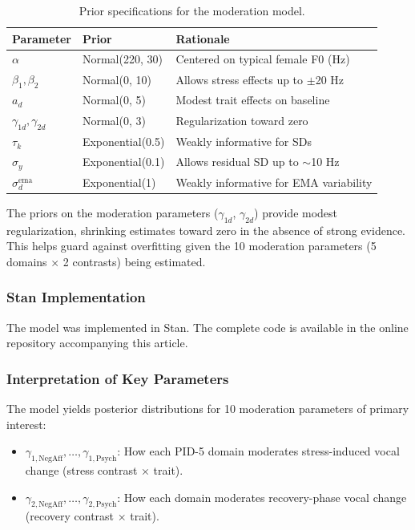 \documentclass[
  english,
  man,floatsintext]{apa6}
\providecommand{\tightlist}{%
  \setlength{\itemsep}{0pt}\setlength{\parskip}{0pt}}
\begin{document}
\begin{table}

\caption{\label{tab:table-s9-priors-moderation}Prior specifications for the moderation model.}
\centering
\begin{tabular}[t]{lll}
\toprule
Parameter & Prior & Rationale\\
\midrule
$\alpha$ & Normal(220, 30) & Centered on typical female F0 (Hz)\\
$\beta_1, \beta_2$ & Normal(0, 10) & Allows stress effects up to $\pm$20 Hz\\
$a_d$ & Normal(0, 5) & Modest trait effects on baseline\\
$\gamma_{1d}, \gamma_{2d}$ & Normal(0, 3) & Regularization toward zero\\
$\tau_k$ & Exponential(0.5) & Weakly informative for SDs\\
\addlinespace
$\sigma_y$ & Exponential(0.1) & Allows residual SD up to $\sim$10 Hz\\
$\sigma_d^{\text{ema}}$ & Exponential(1) & Weakly informative for EMA variability\\
\bottomrule
\end{tabular}
\end{table}

The priors on the moderation parameters (\(\gamma_{1d}\), \(\gamma_{2d}\)) provide modest regularization, shrinking estimates toward zero in the absence of strong evidence. This helps guard against overfitting given the 10 moderation parameters (5 domains × 2 contrasts) being estimated.

\subsubsection{Stan Implementation}\label{stan-implementation}

The model was implemented in Stan. The complete code is available in the online repository accompanying this article.

\subsubsection{Interpretation of Key Parameters}\label{interpretation-of-key-parameters}

The model yields posterior distributions for 10 moderation parameters of primary interest:

\begin{itemize}
\tightlist
\item
  \(\gamma_{1,\text{NegAff}}, \ldots, \gamma_{1,\text{Psych}}\): How each PID-5 domain moderates stress-induced vocal change (stress contrast × trait).
\item
  \(\gamma_{2,\text{NegAff}}, \ldots, \gamma_{2,\text{Psych}}\): How each domain moderates recovery-phase vocal change (recovery contrast × trait).
\end{itemize}
\end{document}
